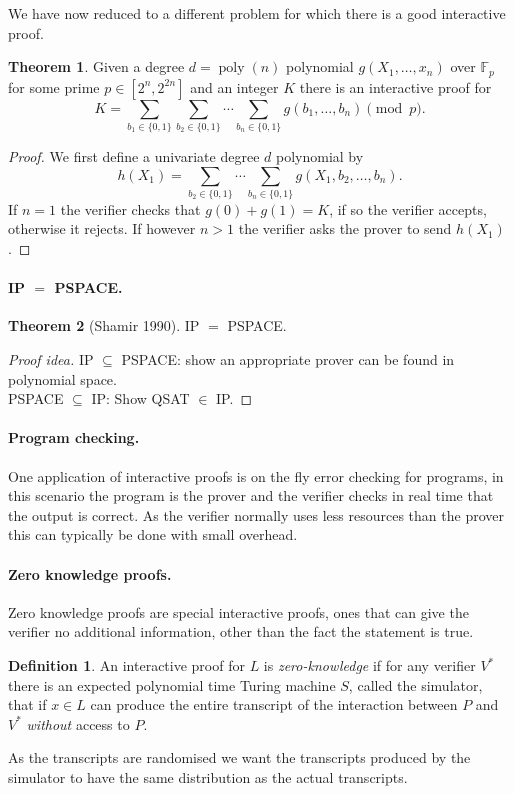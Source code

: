 \documentclass[11pt,a4paper]{article}
\theoremstyle{definition}
\newtheorem{thm}{Theorem}
\newtheorem{defn}{Definition}
\newcommand{\FF}{\mathbb{F}}
\DeclareMathOperator{\poly}{poly}
\begin{document}
We have now reduced to a different problem for which there is a good interactive proof.
\begin{thm}
Given a degree $d= \poly(n)$ polynomial $g(X_1,\ldots,x_n)$ over $\FF_p$ for some prime $p \in [2^n,2^{2n}]$ and an integer $K$ there is an interactive proof for
\[
K= \sum_{b_1\in\{0,1\}} \sum_{b_2\in\{0,1\}} \cdots \sum_{b_n\in\{0,1\}} g(b_1,\ldots,b_n)\pmod{p}.
\]
\end{thm}
\begin{proof}
We first define a univariate degree $d$ polynomial by
\[
h(X_1) = \sum_{b_2\in\{0,1\}} \cdots \sum_{b_n\in\{0,1\}} g(X_1,b_2,\ldots,b_n).
\]
If $n = 1$ the verifier checks that $g(0) + g(1) = K$, if so the verifier accepts, otherwise it rejects.
If however $n > 1$ the verifier asks the prover to send $h(X_1)$.
\end{proof}

\paragraph{IP $=$ PSPACE.}
\begin{thm}[Shamir 1990]
IP $=$ PSPACE.
\end{thm}
\begin{proof}[Proof idea]
IP $\subseteq$ PSPACE: show an appropriate prover can be found in polynomial space.\\
PSPACE $\subseteq$ IP: Show QSAT $\in$ IP.
\end{proof}

\paragraph{Program checking.}
One application of interactive proofs is on the fly error checking for programs, in this scenario the program is the prover and the verifier checks in real time that the output is correct.
As the verifier normally uses less resources than the prover this can typically be done with small overhead.

\paragraph{Zero knowledge proofs.}
Zero knowledge proofs are special interactive proofs, ones that can give the verifier no additional information, other than the fact the statement is true.
\begin{defn}
An interactive proof for $L$ is \emph{zero-knowledge} if for any verifier $V^*$ there is an expected polynomial time Turing machine $S$, called the simulator, that if $x\in L$ can produce the entire transcript of the interaction between $P$ and $V^*$ \emph{without} access to $P$.
\end{defn}
As the transcripts are randomised we want the transcripts produced by the simulator to have the same distribution as the actual transcripts.
\end{document}
